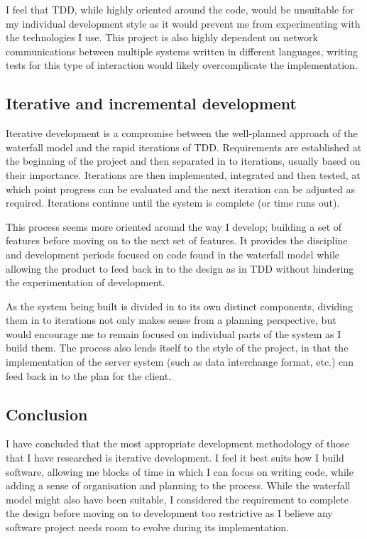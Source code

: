 \documentclass[a4papert,11pt,notitlepage]{ltxdoc}
\begin{document}
I feel that TDD, while highly oriented around the code, would be unsuitable for my individual development style as it would prevent me from experimenting with the technologies I use. This project is also highly dependent on network communications between multiple systems written in different languages, writing tests for this type of interaction would likely overcomplicate the implementation.

\subsection{Iterative and incremental development}
Iterative development is a compromise between the well-planned approach of the waterfall model and the rapid iterations of TDD. Requirements are established at the beginning of the project and then separated in to iterations, usually based on their importance. Iterations are then implemented, integrated and then tested, at which point progress can be evaluated and the next iteration can be adjusted as required. Iterations continue until the system is complete (or time runs out).

This process seems more oriented around the way I develop; building a set of features before moving on to the next set of features. It provides the discipline and development periods focused on code found in the waterfall model while allowing the product to feed back in to the design as in TDD without hindering the experimentation of development.

As the system being built is divided in to its own distinct components, dividing them in to iterations not only makes sense from a planning perspective, but would encourage me to remain focused on individual parts of the system as I build them. The process also lends itself to the style of the project, in that the implementation of the server system (such as data interchange format, etc.) can feed back in to the plan for the client.

\subsection{Conclusion}
I have concluded that the most appropriate development methodology of those that I have researched is iterative development. I feel it best suits how I build software, allowing me blocks of time in which I can focus on writing code, while adding a sense of organisation and planning to the process. While the waterfall model might also have been suitable, I considered the requirement to complete the design before moving on to development too restrictive as I believe any software project needs room to evolve during its implementation.
\end{document}
